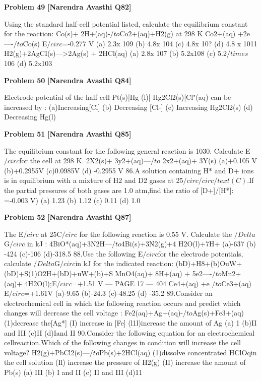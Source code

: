 \begin{problembox}
\textbf{Problem 49} \hfill \textbf{[Narendra Avasthi Q82]}
\label{q:ext-narendra_avasthi_all_questions-49}

Using the standard half-cell potential listed, calculate the equilibrium constant for the
reaction:
Co(s)+ 2H+(aq)-$/to$Co$2$+(aq)+H2(g) at 298 K
Co$2$+(aq) +2e----$/to$Co(s) E$/circ$=-0.277 V
(a) 2.3x 109
(b) 4.8x 104
(c) 4.8x 10?
(d) 4.8 x 1011
H2(g)+2AgCI(s)--->2Ag(s) + 2HCl(aq)
(a) 2.8x 107
(b) 5.2x108
(c) 5.2$/times$ 106
(d) 5.2x103
\end{problembox}

\begin{problembox}
\textbf{Problem 50} \hfill \textbf{[Narendra Avasthi Q84]}
\label{q:ext-narendra_avasthi_all_questions-50}

Electrode potential of the half cell Pt(s)|Hg (l)| Hg2Cl2(s)|Cl"(aq) can be increased by :
(a)Increasing[Cl]
(b) Decreasing [Cl-]
(c) Increasing Hg2Cl2(s)
(d) Decreasing Hg(l)
\end{problembox}

\begin{problembox}
\textbf{Problem 51} \hfill \textbf{[Narendra Avasthi Q85]}
\label{q:ext-narendra_avasthi_all_questions-51}

The equilibrium constant for the following general reaction is 1030. Calculate E$/circ$for the cell at
298 K.
2X2(s)+ 3y2+(aq)---$/to$ 2x2+(aq)+ 3Y(s)
(a)+0.105 V
(b)+0.2955V
(c)0.0985V
(d) -0.2955 V
86.A solution containing H* and D+ ions is in equilibrium with a mixture of H2 and D2 gases at
25$/circ$$/circ/text(C)$.If the partial pressures of both gases are 1.0 atm,find the ratio of [D+]/[H*]:
=-0.003 V)
(a) 1.23
(b) 1.12
(c) 0.11
(d) 1.0
\end{problembox}

\begin{problembox}
\textbf{Problem 52} \hfill \textbf{[Narendra Avasthi Q87]}
\label{q:ext-narendra_avasthi_all_questions-52}

The E$/circ$ at 25C$/circ$ for the following reaction is 0.55 V. Calculate the $/Delta$G$/circ$ in kJ :
4BiO*(aq)+3N2H---$/to$4Bi(s)+3N2(g)+4 H2O(l)+7H+
(a)-637
(b) -424
(c)-106
(d)-318.5
88.Use the following E$/circ$for the electrode potentials, calculate $/Delta$G$/circ$in kJ for the indicated
reaction:
(bD)+H8+(b)OuW+(bD)+S(1)O$2$H+(bD)+uW+(b)+S
MnO4(aq)+ 8H+(aq) + 5e$2$----$/to$Mn$2$+(aq)+ 4H2O(l);E$/circ$=+1.51 V
--- PAGE 17 ---
404
Ce4+(aq) +e  $/to$Ce3+(aq)
E$/circ$=+1.61V
(a)-9.65
(b)-24.3
(c)-48.25
(d) -35.2
89.Consider an electrochemical cell in which the following reaction occurs and predict which
changes will decrcase the cell voltage :
Fe$2$(aq)+Ag+(aq)-$/to$Ag(s)+Fe3+(aq)
(1)decrease the[Ag*]
(I) increase in [Fe]
(l1l)increase the amount of Ag
(a) 1
(b)II and III
(c)II
(d)Iand II
90.Consider the following equation for an electrochemical cellreaction.Which of the following
changes in condition will increase the cell voltage?
H2(g)+PbCl2(s)---$/to$Pb(s)+2HCl(aq)
(1)dissolve concentrated HClOqin the cell solution
(Il) increase the pressure of H2(g)
(II) increase the amount of Pb(s)
(a) III
(b) I and II
(c) II and III
(d)11
\end{problembox}

